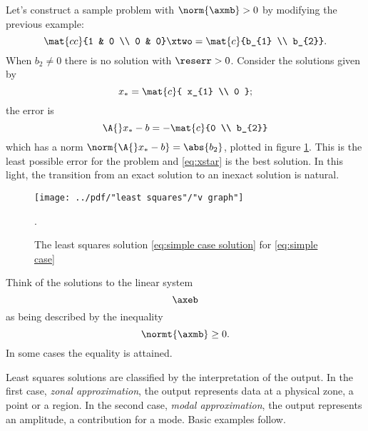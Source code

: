 Let's construct a sample problem with $\norm{\axmb} > 0$ by modifying the previous example:
  \begin{equation}   %
      \mat{cc}{1 & 0 \\ 0 & 0} \xtwo = \mat{c}{b_{1} \\ b_{2}} .
      \label{eq:simple case}
  \end{equation}
When $b_{2} \ne 0$ there is no solution with $\reserr > 0$. Consider the solutions given by
  \begin{equation}   %
      x_{*} = \mat{c}{ x_{1} \\ 0 } ;
      \label{eq:xstar}
  \end{equation}
the error is 
  \begin{equation}   %
      \A{} x_{*} - b = -\mat{c}{0 \\ b_{2}}
  \label{eq:simple case solution}
  \end{equation}
which has a norm $\norm{\A{}x_{*} - b} = \abs{b_{2}}$, plotted in figure \ref{fig:v graph}. This is the least possible error for the problem and \eqref{eq:xstar} is the best solution. In this light, the transition from an exact solution to an inexact solution is natural.

\begin{figure}[htbp] %
   \centering
   \texttt{[image: ../pdf/"least squares"/"v graph"]} 
   \caption{The least squares solution \eqref{eq:simple case solution} for \eqref{eq:simple case}} .
   \label{fig:v graph}
\end{figure}

Think of the solutions to the linear system
  \begin{equation*}   %
    \axeb
  \end{equation*}
as being described by the inequality
  \begin{equation*}   %
    \normt{\axmb} \ge 0.
  \end{equation*}
In some cases the equality is attained.

Least squares solutions are classified by the interpretation of the output. In the first case, \emph{zonal approximation}, the output represents data at a physical zone, a point or a region. In the second case, \emph{modal approximation}, the output represents an amplitude, a contribution for a mode. Basic examples follow.


